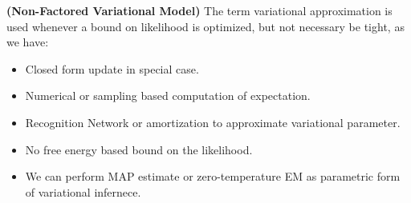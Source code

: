 \begin{remark}{\textbf{(Non-Factored Variational Model)}}
    The term variational approximation is used whenever a bound on likelihood is optimized, but not necessary be tight, as we have:
    \begin{itemize}
        \item Closed form update in special case. 
        \item Numerical or sampling based computation of expectation.
        \item Recognition Network or amortization to approximate variational parameter. 
        \item No free energy based bound on the likelihood. 
        \item We can perform MAP estimate or zero-temperature EM as parametric form of variational infernece. 
    \end{itemize}
\end{remark}

